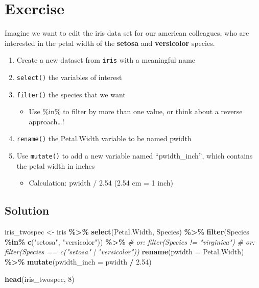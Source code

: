 \documentclass[
]{book}
\newenvironment{Shaded}{\begin{snugshade}}{\end{snugshade}}
\newcommand{\AttributeTok}[1]{\textcolor[rgb]{0.13,0.29,0.53}{#1}}
\newcommand{\CommentTok}[1]{\textcolor[rgb]{0.56,0.35,0.01}{\textit{#1}}}
\newcommand{\DecValTok}[1]{\textcolor[rgb]{0.00,0.00,0.81}{#1}}
\newcommand{\FloatTok}[1]{\textcolor[rgb]{0.00,0.00,0.81}{#1}}
\newcommand{\FunctionTok}[1]{\textcolor[rgb]{0.13,0.29,0.53}{\textbf{#1}}}
\newcommand{\NormalTok}[1]{#1}
\newcommand{\OtherTok}[1]{\textcolor[rgb]{0.56,0.35,0.01}{#1}}
\newcommand{\SpecialCharTok}[1]{\textcolor[rgb]{0.81,0.36,0.00}{\textbf{#1}}}
\newcommand{\StringTok}[1]{\textcolor[rgb]{0.31,0.60,0.02}{#1}}
\providecommand{\tightlist}{%
  \setlength{\itemsep}{0pt}\setlength{\parskip}{0pt}}
\begin{document}
\section{Exercise}\label{exercise-3}

Imagine we want to edit the iris data set for our american colleagues, who are interested in the petal width of the \textbf{setosa} and \textbf{versicolor} species.

\begin{enumerate}
\def\labelenumi{\arabic{enumi}.}
\tightlist
\item
  Create a new dataset from \texttt{iris} with a meaningful name
\item
  \texttt{select()} the variables of interest
\item
  \texttt{filter()} the species that we want

  \begin{itemize}
  \tightlist
  \item
    Use \%in\% to filter by more than one value, or think about a reverse approach\ldots!
  \end{itemize}
\item
  \texttt{rename()} the Petal.Width variable to be named pwidth
\item
  Use \texttt{mutate()} to add a new variable named ``pwidth\_inch'', which contains the petal width in inches

  \begin{itemize}
  \tightlist
  \item
    Calculation: pwidth / 2.54 (2.54 cm = 1 inch)
  \end{itemize}
\end{enumerate}

\subsection{Solution}\label{solution-3}

\begin{Shaded}
\begin{Highlighting}[]
\NormalTok{iris\_twospec }\OtherTok{\textless{}{-}}\NormalTok{ iris }\SpecialCharTok{\%\textgreater{}\%} 
  \FunctionTok{select}\NormalTok{(Petal.Width, Species) }\SpecialCharTok{\%\textgreater{}\%} 
  \FunctionTok{filter}\NormalTok{(Species }\SpecialCharTok{\%in\%} \FunctionTok{c}\NormalTok{(}\StringTok{"setosa"}\NormalTok{, }\StringTok{"versicolor"}\NormalTok{)) }\SpecialCharTok{\%\textgreater{}\%} 
  \CommentTok{\# or: filter(Species != "virginica")}
  \CommentTok{\# or: filter(Species == c("setosa" | "versicolor"))}
  \FunctionTok{rename}\NormalTok{(}\AttributeTok{pwidth =}\NormalTok{ Petal.Width) }\SpecialCharTok{\%\textgreater{}\%} 
  \FunctionTok{mutate}\NormalTok{(}\AttributeTok{pwidth\_inch =}\NormalTok{ pwidth }\SpecialCharTok{/} \FloatTok{2.54}\NormalTok{)}

\FunctionTok{head}\NormalTok{(iris\_twospec, }\DecValTok{8}\NormalTok{)}
\end{Highlighting}
\end{Shaded}
\end{document}
